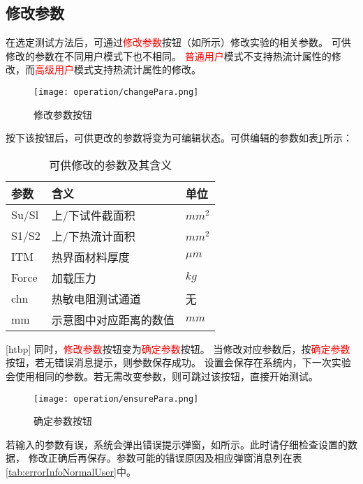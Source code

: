\subsection{修改参数}
在选定测试方法后，可通过\textcolor{red}{修改参数}按钮（如所示）修改实验的相关参数。
可供修改的参数在不同用户模式下也不相同。
\textcolor{red}{普通用户}模式不支持热流计属性的修改，而\textcolor{red}{高级用户}模式支持热流计属性的修改。
\begin{figure}[htbp]
    \centering
    \texttt{[image: operation/changePara.png]}
    \caption{ 修改参数按钮 \label{fig:btnChangePara}}
\end{figure}
按下该按钮后，可供更改的参数将变为可编辑状态。可供编辑的参数如表\ref{tab:editableParaNormalUser}所示：
\begin{table}
    \centering
    \caption{ 可供修改的参数及其含义 \label{tab:editableParaNormalUser}}
    \begin{tabular}{@{}lll@{}}
        \toprule
        参数  & 含义                   & 单位    \\ \midrule
        Su/Sl & 上/下试件截面积        & $mm^2$  \\
        S1/S2 & 上/下热流计面积        & $mm^2$  \\
        ITM   & 热界面材料厚度         & $\mu m$ \\
        Force & 加载压力               & $kg$    \\
        chn   & 热敏电阻测试通道       & 无      \\
        mm    & 示意图中对应距离的数值 & $mm$    \\ \bottomrule
    \end{tabular}
\end{table}[htbp]
同时，\textcolor{red}{修改参数}按钮变为\textcolor{red}{确定参数}按钮。
当修改对应参数后，按\textcolor{red}{确定参数}按钮，若无错误消息提示，则参数保存成功。
设置会保存在系统内，下一次实验会使用相同的参数。若无需改变参数，则可跳过该按钮，直接开始测试。

\begin{figure}[htbp]
    \centering
    \texttt{[image: operation/ensurePara.png]}
    \caption{ 确定参数按钮 \label{fig:ensurePara}}
\end{figure}

\begin{note}
    若输入的参数有误，系统会弹出错误提示弹窗，如所示。此时请仔细检查设置的数据，
    修改正确后再保存。参数可能的错误原因及相应弹窗消息列在表\ref{tab:errorInfoNormalUser}中。
\end{note}

